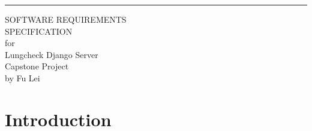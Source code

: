 \documentclass{scrreprt}
\date{}
\begin{document}
\begin{flushright}
    \rule{16cm}{5pt}\vskip1cm
    \begin{bfseries}
        \Huge{SOFTWARE REQUIREMENTS\\ SPECIFICATION}\\
        \vspace{1.9cm}
        for\\
        \vspace{1.9cm}
        Lungcheck Django Server\\
        \vspace{1.9cm}
        Capstone Project\\
        \vspace{3.9cm}
        by Fu Lei\\
    \end{bfseries}
\end{flushright}

\tableofcontents




\chapter{Introduction}
\end{document}
